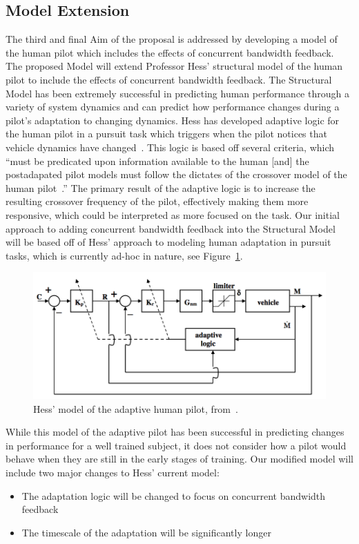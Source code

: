 \subsection{Model Extension}
The third and final Aim of the proposal is addressed by developing a model of the human pilot which includes the effects of concurrent bandwidth feedback.
The proposed Model will extend Professor Hess' structural model of the human pilot to include the effects of concurrent bandwidth feedback.
The Structural Model has been extremely successful in predicting human performance through a variety of system dynamics and can predict how performance changes during a pilot's adaptation to changing dynamics.
Hess has developed adaptive logic for the human pilot in a pursuit task which triggers when the pilot notices that vehicle dynamics have changed~\citep{hess_modeling_2009}.
This logic is based off several criteria, which ``must be predicated upon information available to the human [and] the postadapated pilot models must follow the dictates of the crossover model of the human pilot~\citep{hess_modeling_2009}.''
The primary result of the adaptive logic is to increase the resulting crossover frequency of the pilot, effectively making them more responsive, which could be interpreted as more focused on the task.
Our initial approach to adding concurrent bandwidth feedback into the Structural Model will be based off of Hess' approach to modeling human adaptation in pursuit tasks, which is currently ad-hoc in nature, see Figure~\ref{figure:hesspursuit}.

\begin{figure}[tb]
    \begin{center}
        \includegraphics[width=0.8\linewidth]{figures/Screen_Shot_2018-08-09_at_4_15_24_PM.png}
        \caption{Hess' model of the adaptive human pilot, from~\citep{hess_modeling_2009}.}
        \label{figure:hesspursuit}
    \end{center}
\end{figure}

While this model of the adaptive pilot has been successful in predicting changes in performance for a well trained subject, it does not consider how a pilot would behave when they are still in the early stages of training.
Our modified model will include two major changes to Hess' current model:
\begin{itemize}
    \item The adaptation logic will be changed to focus on concurrent bandwidth feedback
    \item The timescale of the adaptation will be significantly longer
\end{itemize}


